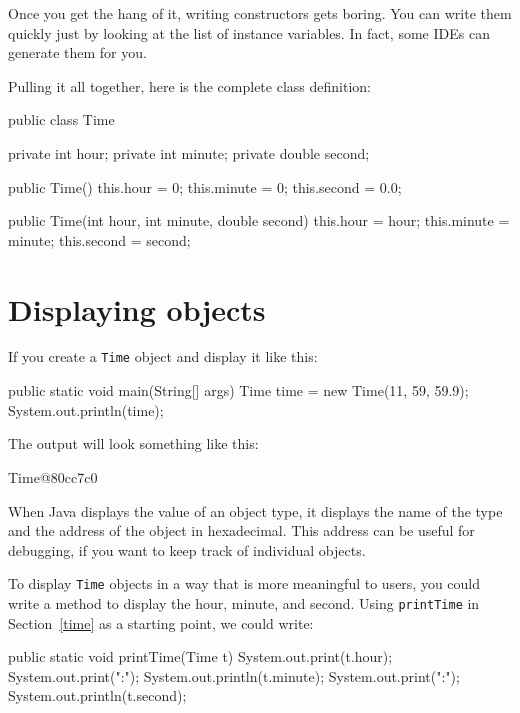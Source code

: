 \documentclass[12pt]{book}
\theoremstyle{exercise}
\newcommand{\java}[1]{\verb"#1"}
\begin{document}
Once you get the hang of it, writing constructors gets boring.
You can write them quickly just by looking at the list of instance variables.
In fact, some IDEs can generate them for you.

Pulling it all together, here is the complete class definition:

\begin{code}
public class Time {
    private int hour;
    private int minute;
    private double second;

    public Time() {
        this.hour = 0;
        this.minute = 0;
        this.second = 0.0;
    }

    public Time(int hour, int minute, double second) {
        this.hour = hour;
        this.minute = minute;
        this.second = second;
    }
}
\end{code}


\section{Displaying objects}
\label{printobject}

If you create a \java{Time} object and display it like this:

\begin{code}
    public static void main(String[] args) {
        Time time = new Time(11, 59, 59.9);
        System.out.println(time);
    }
\end{code}


The output will look something like this:

\begin{stdout}
Time@80cc7c0
\end{stdout}


When Java displays the value of an object type, it displays the name of the type and the address of the object in hexadecimal.
This address can be useful for debugging, if you want to keep track of individual objects.

To display \java{Time} objects in a way that is more meaningful to users, you could write a method to display the hour, minute, and second.
Using \java{printTime} in Section~\ref{time} as a starting point, we could write:

\begin{code}
    public static void printTime(Time t) {
        System.out.print(t.hour);
        System.out.print(":");
        System.out.println(t.minute);
        System.out.print(":");
        System.out.println(t.second);
    }
\end{code}
\end{document}
